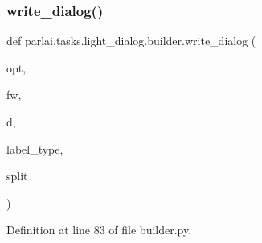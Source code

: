 \subsubsection{\texorpdfstring{write\+\_\+dialog()}{write\_dialog()}}
{\footnotesize\ttfamily def parlai.\+tasks.\+light\+\_\+dialog.\+builder.\+write\+\_\+dialog (\begin{DoxyParamCaption}\item[{}]{opt,  }\item[{}]{fw,  }\item[{}]{d,  }\item[{}]{label\+\_\+type,  }\item[{}]{split }\end{DoxyParamCaption})}



Definition at line 83 of file builder.\+py.


